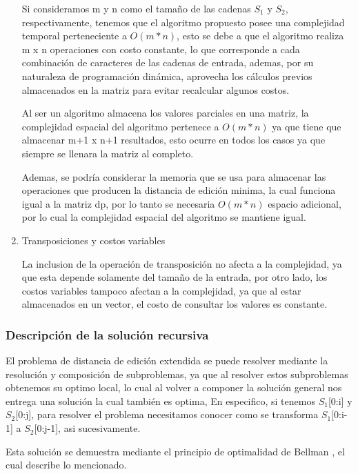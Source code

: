 \begin{enumerate}[1)]
    Si consideramos m y n como el tamaño de las cadenas $S_1$ y $S_2$, 
    respectivamente, tenemos que
    el algoritmo propuesto posee una complejidad temporal 
    perteneciente a $O\left(m*n\right)$, esto
    se debe a que el algoritmo realiza m x n operaciones con costo constante, lo que corresponde
    a cada combinación de caracteres de las cadenas de entrada, ademas, por su naturaleza
    de programación dinámica, aprovecha los cálculos previos almacenados en la matriz para 
    evitar recalcular algunos costos.
    
    Al ser un algoritmo almacena los valores parciales en una matriz, 
    la complejidad espacial del algoritmo pertenece a $O\left(m*n\right)$ 
    ya que tiene que almacenar m+1 x n+1 resultados, esto ocurre en todos los casos
    ya que siempre se llenara la matriz al completo.
    
    Ademas, se podría considerar la memoria que se usa para almacenar las operaciones
    que producen la distancia de edición minima, la cual funciona igual a la matriz dp,
    por lo tanto se necesaria $O\left(m*n\right)$ espacio adicional, por lo cual
    la complejidad espacial del algoritmo se mantiene igual.


    \item Transposiciones y costos variables
    
    La inclusion de la operación de transposición no afecta
    a la complejidad, ya que esta depende solamente del tamaño de la entrada,
    por otro lado, los costos variables tampoco afectan a la complejidad, ya que
    al estar almacenados en un vector, el costo de consultar los valores es constante.

\end{enumerate}

\subsubsection{Descripción de la solución recursiva}

El problema de distancia de edición extendida se puede resolver
mediante la resolución y composición
de subproblemas, ya que al resolver estos subproblemas obtenemos
su optimo local, lo cual al volver a componer la solución general
nos entrega una solución la cual también es optima, En especifico,
si tenemos $S_1$[0:i] y $S_2$[0:j], para resolver el problema
necesitamos conocer como se transforma $S_1$[0:i-1] a $S_2$[0:j-1], asi sucesivamente.

Esta solución se demuestra mediante el principio de optimalidad de Bellman \cite{optimizaciondp}, el
cual describe lo mencionado.

